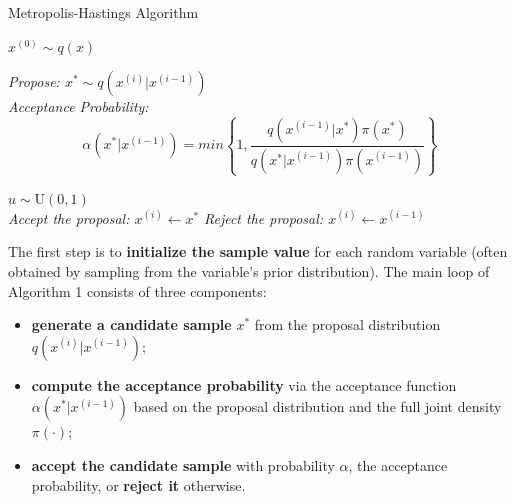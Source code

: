 \begin{algorithm}
\SetAlgoLined
\caption{Metropolis-Hastings Algorithm}
 $x^{(0)}\sim q(x)$ \\
 {
\it{Propose: } $x^* \sim q(x^{(i)}| x^{(i-1)})$ \\
\it{Acceptance Probability: } 
$$ \alpha(x^*|x^{(i-1)}) = min\left\{1, \frac{q(x^{(i-1)}|x^*)\pi(x^*)}{q(x^*|x^{(i-1)})\pi(x^{(i-1)})}\right\}$$

$u \sim \text{U}(0,1)$ \\
{\it{Accept the proposal: }$x^{(i)}\gets x^*$ }
\Else
{\it{Reject the proposal: }$x^{(i)}\gets x^{(i-1)}$}
}
\label{algorithmMH}
\end{algorithm}
\noindent The first step is to \textbf{initialize the sample value} for each random variable (often obtained by sampling from the variable's prior distribution). The main loop of Algorithm 1 consists of three components: 
\begin{itemize}[noitemsep]
	\item \textbf{generate a candidate sample} $x^*$ from the proposal distribution $q(x^{(i)}| x^{(i-1)})$;
	\item \textbf{compute the acceptance probability} via the acceptance function $\alpha(x^*|x^{(i-1)})$ based on the proposal distribution and the full joint density $\pi(\cdot)$;
	\item \textbf{accept the candidate sample} with probability $\alpha$, the acceptance probability, or \textbf{reject it} otherwise. 
\end{itemize}

